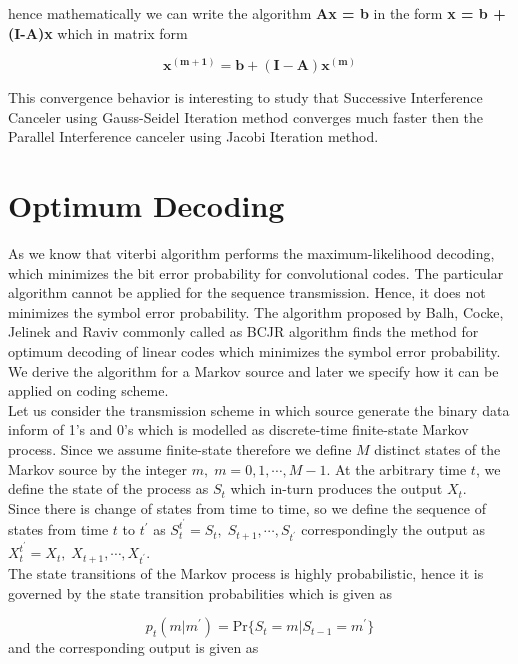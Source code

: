 hence mathematically we can write the algorithm \textbf{Ax = b} in the form \textbf{x = b + (I-A)x} which in matrix form

\begin{equation}
\mathrm{\mathbf{x^{(m+1)}=b+(I-A)x^{(m)}}}
\end{equation}

This convergence behavior is interesting to study that Successive Interference Canceler using Gauss-Seidel Iteration method converges much faster then the Parallel Interference canceler using Jacobi Iteration method.
\newpage
\section{Optimum Decoding}
As we know that viterbi algorithm performs the maximum-likelihood decoding, which minimizes the bit error probability for convolutional codes. The particular algorithm cannot be applied for the sequence transmission. Hence, it does not minimizes the symbol error probability. The algorithm proposed by Balh, Cocke, Jelinek and Raviv commonly called as BCJR algorithm finds the method for optimum decoding of linear codes which minimizes the symbol error probability. We derive the algorithm for a Markov source and later we specify how it can be applied on coding scheme. \\

Let us consider the transmission scheme in which source generate the binary data inform of 1's and 0's which is modelled as discrete-time finite-state Markov process. Since we assume finite-state therefore we define $M$ distinct states of the Markov source by the integer $m,\;m=0,1,\cdots,M-1$. At the arbitrary time $t$, we define the state of the process as $S_t$ which in-turn produces the output $X_t$. \\

Since there is change of states from time to time, so we define the sequence of states from time $t$ to $t^{'}$ as $S_t^{t^{'}}=S_t,\;S_{t+1},\cdots,S_{t^{'}}$ correspondingly the output as $X_t^{t^{'}}=X_t,\;X_{t+1},\cdots,X_{t^{'}}$. \\

The state transitions of the Markov process is highly probabilistic, hence it is governed by the state transition probabilities which is given as

\begin{equation}
p_t(m\vert m^{'})=\mathrm{Pr}\{S_t=m\vert S_{t-1}=m^{'}\}
\end{equation}
and the corresponding output is given as

